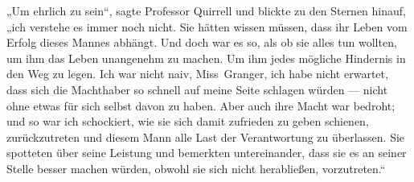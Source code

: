 „Um ehrlich zu sein“, sagte Professor Quirrell und blickte zu den Sternen hinauf, „ich verstehe es immer noch nicht. Sie hätten wissen müssen, dass ihr Leben vom Erfolg dieses Mannes abhängt. Und doch war es so, als ob sie alles tun wollten, um ihm das Leben unangenehm zu machen. Um ihm jedes mögliche Hindernis in den Weg zu legen. Ich war nicht naiv, Miss~Granger, ich habe nicht erwartet, dass sich die Machthaber so schnell auf meine Seite schlagen würden — nicht ohne etwas für sich selbst davon zu haben. Aber auch ihre Macht war bedroht; und so war ich schockiert, wie sie sich damit zufrieden zu geben schienen, zurückzutreten und diesem Mann alle Last der Verantwortung zu überlassen. Sie spotteten über seine Leistung und bemerkten untereinander, dass sie es an seiner Stelle besser machen würden, obwohl sie sich nicht herabließen, vorzutreten.“
